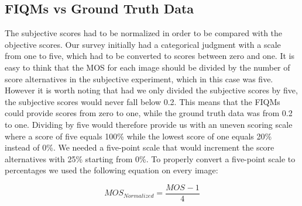 \subsection{FIQMs vs Ground Truth Data}
The subjective scores had to be normalized in order to be compared with the objective scores. Our survey initially had a categorical judgment with a scale from one to five, which had to be converted to scores between zero and one. It is easy to think that the MOS for each image should be divided by the number of score alternatives in the subjective experiment, which in this case was five. However it is worth noting that had we only divided the subjective scores by five, the subjective scores would never fall below 0.2. This means that the FIQMs could provide scores from zero to one, while the ground truth data was from 0.2 to one. Dividing by five would therefore provide us with an uneven scoring scale where a score of five equals 100\% while the lowest score of one equals 20\% instead of 0\%. We needed a five-point scale that would increment the score alternatives with 25\% starting from 0\%. To properly convert a five-point scale to percentages we used the following equation on every image:

\begin{equation}
    MOS_{Normalized} = \frac{MOS_{} - 1}{4}
\end{equation}

